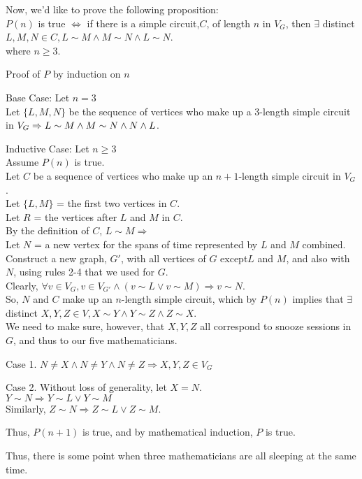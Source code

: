 \documentclass[fleqn]{article}
\begin{document}
Now, we'd like to prove the following proposition:\\
$P(n)$ is true $\Leftrightarrow$ if there is a simple circuit,$C$, of length $n$ in $V_G$, then $\exists$ distinct $ L,M,N \in C,
                        L \sim M \wedge M \sim N \wedge L \sim N$.\\
where $n \geq 3$.

Proof of $P$ by induction on $n$

Base Case: Let $n = 3$\\
Let $\lbrace L, M, N \rbrace$ be the sequence of vertices who make up a 3-length simple circuit in $V_G \Rightarrow\\
L \sim M \wedge M \sim N \wedge N \wedge L$.

Inductive Case: Let $n \geq 3$\\
Assume $P(n)$ is true.\\
Let $C$ be a sequence of vertices who make up an $n+1$-length simple circuit in $V_G$.\\
Let $\lbrace L,M \rbrace$ = the first two vertices in $C$.\\
Let $R$ = the vertices after $L$ and $M$ in $C$.\\
By the definition of $C$, $L \sim M \Rightarrow$\\
Let $N$ = a new vertex for the spans of time represented by $L$ and $M$ combined.\\
Construct a new graph, $G'$, with all vertices of $G$ except$L$ and $M$, and also with $N$, using rules 2-4 that we used for $G$.\\
Clearly, $\forall v \in V_G, v \in V_{G'} \wedge (v \sim L \vee v \sim M)
          \Rightarrow v \sim N$.\\
So, $N$ and $C$ make up an $n$-length simple circuit, which by $P(n)$ implies that $\exists$ distinct $X,Y,Z \in V,
              X \sim Y \wedge Y \sim Z \wedge Z \sim X$.\\
We need to make sure, however, that $X,Y,Z$ all correspond to snooze sessions in $G$, and thus to our five mathematicians.

Case 1. $N \not= X \wedge N \not= Y \wedge N \not= Z \Rightarrow
        X,Y,Z \in V_G$

Case 2. Without loss of generality, let $X = N$.\\
        $Y \sim N \Rightarrow Y \sim L \vee Y \sim M$\\
        Similarly, $Z \sim N \Rightarrow Z \sim L \vee Z \sim M$.

Thus, $P(n+1)$ is true, and by mathematical induction, $P$ is true.

Thus, there is some point when three mathematicians are all sleeping at the same time.
\end{document}
